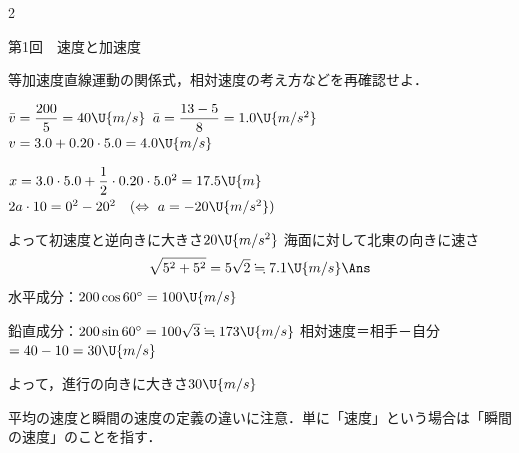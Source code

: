 \newpage

\setlength{\columnseprule}{0.4pt}
\begin{multicols}{2}

{\gtfamily\large 第1回　速度と加速度}\par\vspace{2mm}

\begin{sisin}
等加速度直線運動の関係式，相対速度の考え方などを再確認せよ．
\end{sisin}
\begin{komon}
 $\bar{v}=\dfrac{200}{5}=40\U{m/s}$\Ans
{} $\bar{a}=\dfrac{13-5}{8}=1.0\U{m/s^2}$\Ans
{} $v=3.0+0.20\cdot 5.0=4.0\U{m/s}$\Ans\par
       $x=3.0\cdot 5.0+\dfrac{1}{2}\cdot 0.20\cdot 5.0^2=17.5\U{m}$\Ans
{} $2a\cdot 10=0^2-20^2\quad(\Leftrightarrow\ a=-20\U{m/s^2})$\par
       よって初速度と逆向きに大きさ$20\U{m/s^2}$\Ans
{} 海面に対して北東の向きに速さ
       \[\sqrt{5^2+5^2}=5\sqrt{2}\fallingdotseq 7.1\U{m/s}\Ans\]
 水平成分：$200\cos 60^\circ=100\U{m/s}$\Ans\par
       鉛直成分：$200\sin 60^\circ=100\sqrt{3}\fallingdotseq 173\U{m/s}$\Ans
{} 相対速度＝相手－自分$=40-10=30\U{m/s}$\par
       よって，進行の向きに大きさ$30\U{m/s}$\Ans
\end{komon}

\begin{sisin}
平均の速度と瞬間の速度の定義の違いに注意．単に「速度」という場合は「瞬間の速度」のことを指す．


\end{sisin}
\end{multicols}
